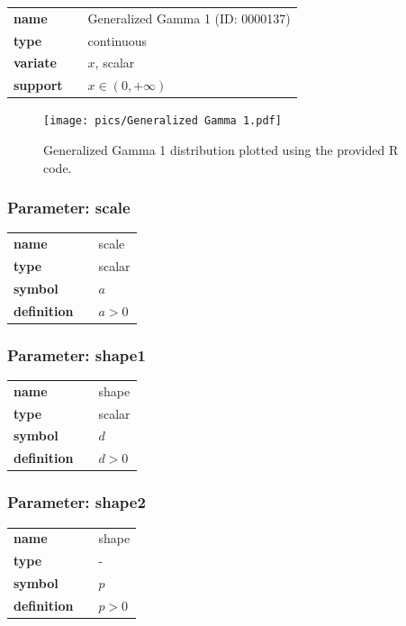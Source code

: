 \documentclass{article}
\begin{document}
  \bigskip 

\begin{tabular}{p{2cm}cl}
\textbf{name} & & Generalized Gamma 1 (ID: 0000137)\\ 
 
\textbf{type} & & continuous \\ 

\textbf{variate} & & $x$, scalar \\ 

\textbf{support} & & $x \in (0,+\infty)$
\end{tabular}

\begin{figure}[ht!]
\centering
  \texttt{[image: pics/Generalized Gamma 1.pdf]}
 \caption{Generalized Gamma 1 distribution plotted using the provided R code.}
 \label{fig:Generalized Gamma 1}
\end{figure}

\subsubsection*{Parameter: scale}

\noindent\begin{tabular}{p{2cm}cl}
\textbf{name} & & scale \\
\textbf{type} & & scalar \\
\textbf{symbol} & & $a$  \\
\textbf{definition} & & $a > 0$
\end{tabular}
\subsubsection*{Parameter: shape1}

\noindent\begin{tabular}{p{2cm}cl}
\textbf{name} & & shape \\
\textbf{type} & & scalar \\
\textbf{symbol} & & $d$  \\
\textbf{definition} & & $d > 0$
\end{tabular}
\subsubsection*{Parameter: shape2}

\noindent\begin{tabular}{p{2cm}cl}
\textbf{name} & & shape \\
\textbf{type} & & - \\
\textbf{symbol} & & $p$  \\
\textbf{definition} & & $p > 0$
\end{tabular}
\end{document}
